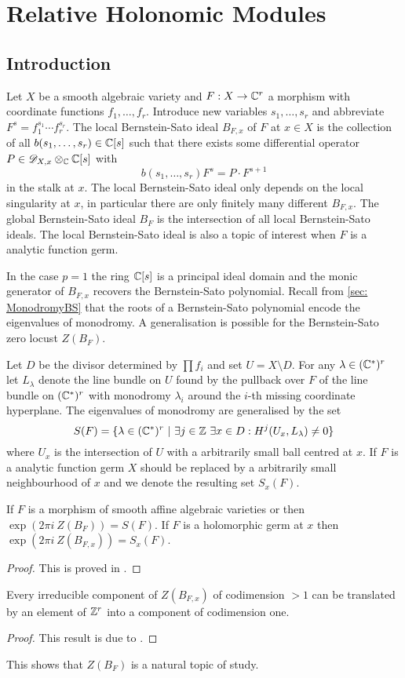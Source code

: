 \chapter{Relative Holonomic Modules}\label{ch: ChapterRelHol}
\section{Introduction}\label{sec: IntoductionChapterRelative}
Let $X$ be a smooth algebraic variety and $F:X\to \mathbb{C}^r$ a morphism with coordinate functions $f_1,\ldots, f_r$.
Introduce new variables $s_1,\ldots, s_r$ and abbreviate $F^s = f_1^{s_1}\cdots f_r^{s_r}$.
The local Bernstein-Sato ideal $B_{F,x}$ of $F$ at $x\in X$ is the collection of all $b(s_1,\ldots,s_r)\in \mathbb{C}[s]$ such that there exists some differential operator $P\in \mathscr{D}_{X,x}\otimes_{\mathbb{C}}\mathbb{C}[s]$ with
$$b(s_1,\ldots,s_r) F^s =  P\cdot F^{s + 1}$$
in the stalk at $x$.
The local Bernstein-Sato ideal only depends on the local singularity at $x$, in particular there are only finitely many different $B_{F,x}$.
The global Bernstein-Sato ideal $B_F$ is the intersection of all local Bernstein-Sato ideals.
The local Bernstein-Sato ideal is also a topic of interest when $F$ is a analytic function germ.

In the case $p=1$ the ring $\mathbb{C}[s]$ is a principal ideal domain and the monic generator of $B_{F,x}$ recovers the Bernstein-Sato polynomial.
Recall from \cref{sec: MonodromyBS} that the roots of a Bernstein-Sato polynomial encode the eigenvalues of monodromy.
A generalisation is possible for the Bernstein-Sato zero locust $Z(B_F)$.

Let $D$ be the divisor determined by $\prod f_i$ and set $U= X\setminus D$.
For any $\lambda \in (\mathbb{C}^*)^r$ let $L_\lambda$ denote the line bundle on $U$ found by the pullback over $F$ of the line bundle on $(\mathbb{C}^*)^r$ with monodromy $\lambda_i$ around the $i$-th missing coordinate hyperplane.
The eigenvalues of monodromy are generalised by the set
$$S(F) = \{\lambda \in (\mathbb{C}^*)^r \ \vert\  \exists j\in \mathbb{Z}\  \exists x\in D: H^j(U_x,L_\lambda) \neq 0\} $$
where $U_x$ is the intersection of $U$ with a arbitrarily small ball centred at $x$.
If $F$ is a analytic function germ $X$ should be replaced by a arbitrarily small neighbourhood of $x$ and we denote the resulting set $S_x(F)$.
\begin{theorem}
  If $F$ is a morphism of smooth affine algebraic varieties or then $\exp(2\pi i\ Z(B_F)) = S(F)$. If $F$ is a holomorphic germ at $x$ then $\exp(2\pi i\ Z(B_{F,x})) = S_x(F)$.
\end{theorem}
\begin{proof}
  This is proved in \cite{budur2019zero}.
\end{proof}
\begin{theorem}
  Every irreducible component of $Z(B_{F,x})$ of codimension $>1$ can be translated by an element of $\mathbb{Z}^r$ into a component of codimension one.
\end{theorem}
\begin{proof}
  This result is due to \cite{maisonobe2016filtration}.
\end{proof}
This shows that $Z(B_{F})$ is a natural topic of study.

